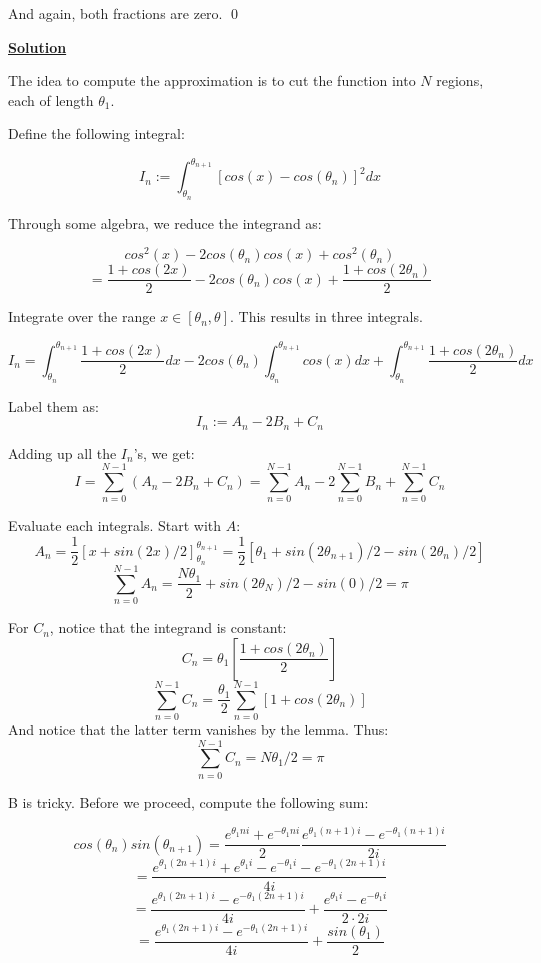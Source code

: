 \documentclass{article}
\newcommand{\new}[1]{
    \vspace{2mm}
    \noindent
    \textbf{
    \underline{#1}}
}
\def\th{{\theta}}
\begin{document}
And again, both fractions are zero. 
\qed

\new{Solution}
The idea to compute the approximation is to 
cut the function into $N$ regions, each of length
$\th_1$. 

Define the following integral:

\[
    I_n := \int_{\th_n}^{\th_{n+1}}[cos(x)-cos(\th_n)]^2dx
\]

Through some algebra, we reduce the integrand as:

\[
    cos^2(x)-2cos(\th_n)cos(x)+cos^2(\th_n)
    \] \[
    =
    \frac{1+cos(2x)}{2}
    -2cos(\th_n)cos(x)
    +\frac{1+cos(2\th_n)}{2}
\]

Integrate over the range 
$x \in [\th_n, \th]$. This results 
in three integrals. 

\[
    I_n = 
    \int_{\th_n}^{\th_{n+1}}
    \frac{1+cos(2x)}{2}dx
    -2cos(\th_n)
    \int_{\th_n}^{\th_{n+1}}
    cos(x)dx
    +
    \int_{\th_n}^{\th_{n+1}}
    \frac{1+cos(2\th_n)}{2}dx
\]

Label them as:
\[
    I_n := A_n-2B_n+C_n
\]

Adding up all the $I_n$'s, we get:
\[
     I = \sum_{n = 0}^{N-1} (A_n-2B_n+C_n)
     = \sum_{n = 0}^{N-1} A_n 
     -2\sum_{n = 0}^{N-1} B_n 
     +\sum_{n = 0}^{N-1} C_n 
\]

Evaluate each integrals. Start with $A$:
\[
    A_n = 
    \frac{1}{2}
    [x+sin(2x)/2]_{\th_n}^{\th_{n+1}}
    =
    \frac{1}{2}
    [\th_1+sin(2\th_{n+1})/2-sin(2\th_{n})/2]
\]
\[
    \sum_{n = 0}^{N-1} A_n = 
    \frac{N\th_1}{2}+sin(2\th_{N})/2-sin(0)/2
    =\pi
\]

For $C_n$, notice that the integrand is constant:
\[
    C_n = \th_1\left[
    \frac{1+cos(2\th_n)}{2}
    \right]
\]
\[
    \sum_{n = 0}^{N-1}C_n = 
    \frac{\th_1}{2}\sum_{n = 0}^{N-1}
    \left[
        1+cos(2\th_n)
    \right]
\]
And notice that the latter term vanishes 
by the lemma. Thus:
\[
    \sum_{n = 0}^{N-1}C_n =  N\th_1/2 = \pi
\]

B is tricky. Before we proceed, compute the 
following sum:

\newpage

\[
    cos(\th_n)sin(\th_{n+1}) = 
    \frac{e^{\th_1ni}+e^{-\th_1ni}}{2}
    \frac{e^{\th_1(n+1)i}-e^{-\th_1(n+1)i}}{2i}
\] \[
    =
    \frac{e^{\th_1(2n+1)i}
        +e^{\th_1i}
        -e^{-\th_1i}
        -e^{-\th_1(2n+1)i}
    }
    {4i}
\]
\[
    =
    \frac{e^{\th_1(2n+1)i}
        -e^{-\th_1(2n+1)i}
    }
    {4i}
    +
    \frac{e^{\th_1i}
        -e^{-\th_1i}}
        {2\cdot 2i}
\]
\[
    =
    \frac{e^{\th_1(2n+1)i}
        -e^{-\th_1(2n+1)i}
    }
    {4i}
    +
    \frac{sin(\th_1)}
        {2}
\]
\end{document}
